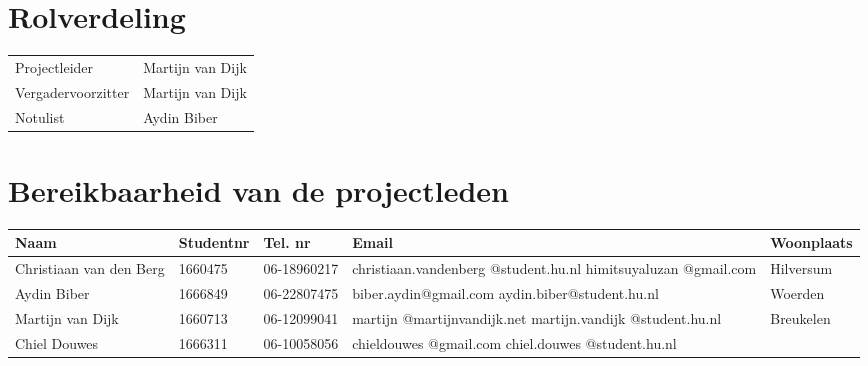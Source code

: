 \documentclass[dutch]{hu}
\subtitle{Teamcontract}
\begin{document}
\maketitle
\newpage

\chapter{Rolverdeling}
\begin{tabular}{l l}
Projectleider & Martijn van Dijk \\
Vergadervoorzitter & Martijn van Dijk \\
Notulist & Aydin Biber
\end{tabular}

\chapter{Bereikbaarheid van de projectleden}
\begin{tabular}{p{3cm} l l p{4cm} p{3cm}}
\textbf{Naam} & 
\textbf{Studentnr} & 
\textbf{Tel. nr} & 
\textbf{Email} & 
\textbf{Woonplaats} \\
\hline

Christiaan van den Berg & 1660475 & 06-18960217 & christiaan.vandenberg @student.hu.nl himitsuyaluzan @gmail.com & Hilversum \\

Aydin Biber & 1666849 & 06-22807475 & biber.aydin@gmail.com aydin.biber@student.hu.nl & Woerden \\

Martijn van Dijk & 1660713 & 06-12099041 & martijn @martijnvandijk.net martijn.vandijk @student.hu.nl & Breukelen \\

Chiel Douwes & 1666311 & 06-10058056 & chieldouwes @gmail.com chiel.douwes @student.hu.nl 
\end{tabular}
\end{document}

